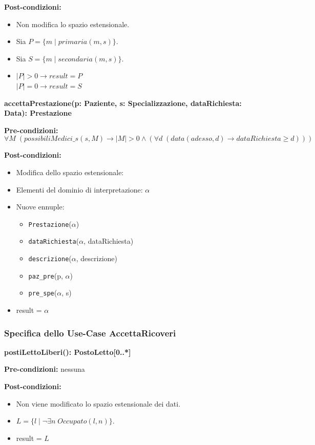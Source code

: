 \documentclass{article}
\begin{document}
\textbf{Post-condizioni:}
\begin{itemize}
    \item Non modifica lo spazio estensionale.
    \item Sia \( P = \{m \mid primaria(m,s)\} \).
    \item Sia \( S = \{m \mid secondaria(m,s)\} \).
    \item \(|P| > 0 \rightarrow result = P \) \\
    \(|P| = 0 \rightarrow result = S \)
\end{itemize}

\textbf{accettaPrestazione(p: Paziente, s: Specializzazione, dataRichiesta: Data): Prestazione}

\textbf{Pre-condizioni:}
\[
\forall M \; (possibiliMedici\_s(s,M) \rightarrow |M| > 0 \land (\forall d \; (data(adesso,d) \rightarrow dataRichiesta \geq d)))
\]

\textbf{Post-condizioni:}
\begin{itemize}
    \item Modifica dello spazio estensionale:
    \item Elementi del dominio di interpretazione: \( \alpha \)
    \item Nuove ennuple:
    \begin{itemize}
        \item \texttt{Prestazione}(\(\alpha\))
        \item \texttt{dataRichiesta}(\(\alpha\), dataRichiesta)
        \item \texttt{descrizione}(\(\alpha\), descrizione)
        \item \texttt{paz\_pre}(p, \(\alpha\))
        \item \texttt{pre\_spe}(\(\alpha\), s)
    \end{itemize}
    \item result = \( \alpha \)
\end{itemize}

\newpage
\subsubsection{Specifica dello Use-Case AccettaRicoveri}

\textbf{postiLettoLiberi(): PostoLetto[0..*]}

\textbf{Pre-condizioni:} nessuna

\textbf{Post-condizioni:}
\begin{itemize}
    \item Non viene modificato lo spazio estensionale dei dati.
    \item \( L = \{l \mid \neg \exists n \; Occupato(l,n)\} \).
    \item result = \( L \)
\end{itemize}
\end{document}
